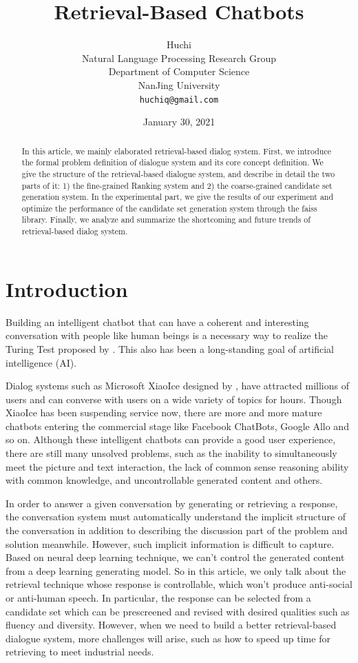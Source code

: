 \documentclass{article}
\title{Retrieval-Based Chatbots}
\date{January 30, 2021}	%
\author{ {
\hspace{1mm}Huchi} \\
Natural Language Processing Research Group\\
	Department of Computer Science\\
	NanJing University\\
	\texttt{huchiq@gmail.com} \\
}
\begin{document}
\maketitle

\begin{abstract}
In this article, we mainly elaborated retrieval-based dialog system. First, we introduce the formal problem definition of dialogue system and its core concept definition. We give the structure of the retrieval-based dialogue system, and describe in detail the two parts of it: 1) the fine-grained Ranking system and 2) the coarse-grained candidate set generation system. In the experimental part, we give the results of our experiment and optimize the performance of the candidate set generation system through the faiss library. Finally, we analyze and summarize the shortcoming and future trends of retrieval-based dialog system.
\end{abstract}


\section{Introduction}
Building an intelligent chatbot that can have a coherent and interesting conversation with people like human beings is a necessary way to realize the Turing Test proposed by \cite{turing2009computing}. This also has been a long-standing goal of artificial intelligence (AI).

Dialog systems such as Microsoft XiaoIce designed by \cite{zhou2020design}, have attracted millions of users and can converse with users on a wide variety of topics for hours. Though XiaoIce has been suspending service now, there are more and more mature chatbots entering the commercial stage like Facebook ChatBots, Google Allo and so on. Although these intelligent chatbots can provide a good user experience, there are still many unsolved problems, such as the inability to simultaneously meet the picture and text interaction, the lack of common sense reasoning ability with common knowledge, and uncontrollable generated content and others. \par

In order to answer a given conversation by generating or retrieving a response, the conversation system must automatically understand the implicit structure of the conversation in addition to describing the discussion part of the problem and solution meanwhile. However, such implicit information is difficult to capture. Based on neural deep learning technique, we can't control the generated content from a deep learning generating model. So in this article, we only talk about the retrieval technique whose response is controllable, which won't produce anti-social or anti-human speech. In particular,  the response can be selected from a candidate set which can be prescreened and revised with desired qualities such as fluency and diversity. However, when we need to build a better retrieval-based dialogue system, more challenges will arise, such as how to speed up time for retrieving to meet industrial needs. \par
\end{document}
